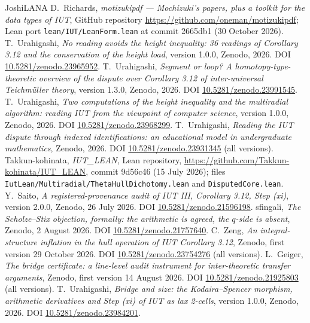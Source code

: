 \documentclass[11pt]{article}
\theoremstyle{plain}
\theoremstyle{definition}
\theoremstyle{remark}
\begin{document}
\begin{thebibliography}{JoshiLANA}
 D.~Richards, \emph{motizukipdf --- Mochizuki's papers, plus a toolkit for
 the data types of IUT}, GitHub repository \url{https://github.com/oneman/motizukipdf};
 Lean port \texttt{lean/IUT/LeanForm.lean} at commit 2665db1 (30 October 2026).
 T.~Urahigashi, \emph{No reading avoids the height inequality: 36 readings
 of Corollary 3.12 and the conservation of the height load}, version 1.0.0, Zenodo, 2026.
 DOI \href{https://doi.org/10.5281/zenodo.23965952}{10.5281/zenodo.23965952}.
 T.~Urahigashi, \emph{Segment or loop? A homotopy-type-theoretic overview
 of the dispute over Corollary 3.12 of inter-universal Teichm\"uller theory}, version 1.3.0,
 Zenodo, 2026. DOI \href{https://doi.org/10.5281/zenodo.23991545}{10.5281/zenodo.23991545}.
 T.~Urahigashi, \emph{Two computations of the height inequality and the
 multiradial algorithm: reading IUT from the viewpoint of computer science}, version 1.0.0,
 Zenodo, 2026. DOI \href{https://doi.org/10.5281/zenodo.23968299}{10.5281/zenodo.23968299}.
 T.~Urahigashi, \emph{Reading the IUT dispute through indexed
 identifications: an educational model in undergraduate mathematics}, Zenodo, 2026.
 DOI \href{https://doi.org/10.5281/zenodo.23931345}{10.5281/zenodo.23931345} (all versions).
 Takkun-kohinata, \emph{IUT\_LEAN}, Lean repository,
 \url{https://github.com/Takkun-kohinata/IUT_LEAN}, commit 9d56c46 (15 July 2026); files
 \texttt{IutLean/Multiradial/ThetaHullDichotomy.lean} and \texttt{DisputedCore.lean}.
 Y.~Saito, \emph{A registered-provenance audit of IUT III, Corollary 3.12,
 Step (xi)}, version 2.0.0, Zenodo, 26 July 2026.
 DOI \href{https://doi.org/10.5281/zenodo.21596198}{10.5281/zenodo.21596198}.
 sfingali, \emph{The Scholze--Stix objection, formally: the
 arithmetic is agreed, the $q$-side is absent}, Zenodo, 2 August 2026.
 DOI \href{https://doi.org/10.5281/zenodo.21757640}{10.5281/zenodo.21757640}.
 C.~Zeng, \emph{An integral-structure inflation in the hull operation of
 IUT Corollary 3.12}, Zenodo, first version 29 October 2026.
 DOI \href{https://doi.org/10.5281/zenodo.23754276}{10.5281/zenodo.23754276} (all versions).
 L.~Geiger, \emph{The bridge certificate: a line-level audit instrument for
 inter-theoretic transfer arguments}, Zenodo, first version 14 August 2026.
 DOI \href{https://doi.org/10.5281/zenodo.21925803}{10.5281/zenodo.21925803} (all versions).
 T.~Urahigashi, \emph{Bridge and size: the Kodaira--Spencer morphism,
 arithmetic derivatives and Step (xi) of IUT as lax 2-cells}, version 1.0.0, Zenodo, 2026.
 DOI \href{https://doi.org/10.5281/zenodo.23984201}{10.5281/zenodo.23984201}.
\end{thebibliography}
\end{document}
